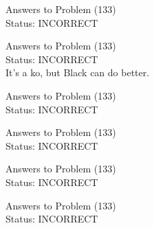 \documentclass[11pt]{article}
\begin{document}
\begin{minipage}[t]{0.5\textwidth}
  {\centering
  
  Answers to Problem (133)\\
  Status: INCORRECT\\
  
  }
\end{minipage}
\begin{minipage}[t]{0.5\textwidth}
  {\centering
  
  Answers to Problem (133)\\
  Status: INCORRECT\\
  It's a ko, but Black can do better.\\
  }
\end{minipage}
\begin{minipage}[t]{0.5\textwidth}
  {\centering
  
  Answers to Problem (133)\\
  Status: INCORRECT\\
  
  }
\end{minipage}
\begin{minipage}[t]{0.5\textwidth}
  {\centering
  
  Answers to Problem (133)\\
  Status: INCORRECT\\
  
  }
\end{minipage}
\begin{minipage}[t]{0.5\textwidth}
  {\centering
  
  Answers to Problem (133)\\
  Status: INCORRECT\\
  
  }
\end{minipage}
\begin{minipage}[t]{0.5\textwidth}
  {\centering
  
  Answers to Problem (133)\\
  Status: INCORRECT\\
  
  }
\end{minipage}
\end{document}
